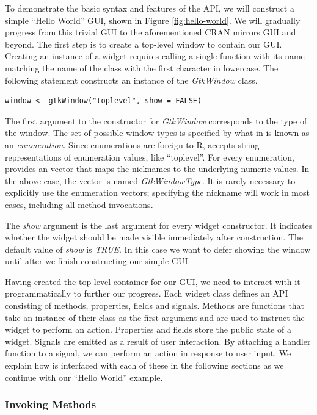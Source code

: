 \documentclass[article]{jss}
\begin{document}
To demonstrate the basic syntax and
features of the  API, we will construct a simple ``Hello World'' GUI,
shown in Figure \ref{fig:hello-world}. We will gradually 
progress from this trivial GUI to the aforementioned CRAN mirrors GUI and beyond.
The first step is to create a top-level window to contain our GUI.
Creating an instance of a  widget requires calling a single  
function with its name matching the name of the class with the first character in 
lowercase. The following statement constructs an instance of the \emph{GtkWindow} class.
\begin{verbatim}
window <- gtkWindow("toplevel", show = FALSE)
\end{verbatim}

The first argument to the constructor for \emph{GtkWindow} corresponds to the  
type of the window. The set of possible window types is specified by what in 
 is known as an \emph{enumeration}. Since enumerations are foreign 
to R,  accepts string representations of enumeration values, like 
``toplevel''. For every  enumeration,  provides an 
 vector that maps the nicknames to the underlying numeric values. 
In the above case, the vector is named \emph{GtkWindowType}. It is rarely 
necessary to explicitly use the enumeration vectors; specifying the nickname 
will work in most cases, including all method invocations.

The \emph{show} argument is the last argument for every widget constructor. It
indicates whether the widget should be made visible immediately after construction.
The default value of \emph{show} is \emph{TRUE}. In this case we want to
defer showing the window until after we finish constructing our simple GUI.

Having created the top-level container for our GUI, we need to interact with it
programmatically to further our progress. Each widget class defines an API 
consisting of methods, properties, fields and signals. Methods are functions 
that take an instance of their class as the first argument and are used to instruct the 
widget to perform an action. Properties and fields store the public state of a widget. 
Signals are emitted as a result of user interaction.
By attaching a handler function to a signal, we can perform an action in response
to user input. We explain how  is interfaced
with each of these in the following sections as we continue with our ``Hello World'' example.

\subsubsection{Invoking Methods}
\end{document}
